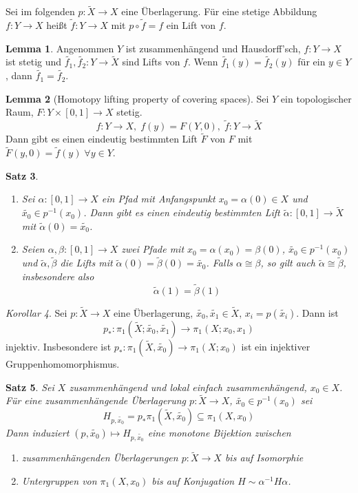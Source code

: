 \documentclass[a4paper, 12pt]{article}
\theoremstyle{plain}
\newtheorem{theorem}{Satz}[section] %
\theoremstyle{definition}
\theoremstyle{lemma}
\newtheorem{lemma}[theorem]{Lemma}
\theoremstyle{remark}
\theoremstyle{corollary}
\newtheorem{corollary}[theorem]{Korollar}
\theoremstyle{example}
\begin{document}
	Sei im folgenden $p: \tilde{X} \to X$ eine Überlagerung. Für eine stetige Abbildung $f:Y \to X$ heißt $\tilde{f}: Y \to X$ mit $p \circ \tilde{f} = f$ ein Lift von $f$.
	\begin{lemma}
		Angenommen $Y$ ist zusammenhängend und Hausdorff'sch, $f:Y \to X$ ist stetig und $\tilde{f_1}, \tilde{f_2}: Y \to \tilde{X}$ sind Lifts von $f$. Wenn $\tilde{f_1}(y) = \tilde{f_2}(y)$ für ein $y \in Y$, dann $\tilde{f_1} = \tilde{f_2}$. 
	\end{lemma}
	\begin{lemma}[Homotopy lifting property of covering spaces]
		Sei $Y$ ein topologischer Raum, $F:Y\times [0,1] \to X$ stetig. \[f:Y \to X, \; f(y) = F(Y,0), \; \tilde{f}: Y \to \tilde{X}\]
		Dann gibt es einen eindeutig bestimmten Lift $\tilde{F}$ von $F$ mit $\tilde{F}(y,0) = \tilde{f}(y) \; \forall y \in Y$.
	\end{lemma}
	\begin{theorem}
		\begin{enumerate}
			\item Sei $\alpha: [0,1] \to X$ ein Pfad mit Anfangspunkt $x_0 = \alpha(0) \in X$ und $\tilde{x_0} \in p^{-1}(x_0)$. Dann gibt es einen eindeutig bestimmten Lift $\tilde{\alpha}: [0,1] \to \tilde{X}$ mit $\tilde{\alpha}(0) = \tilde{x_0}$.
			\item Seien $\alpha, \beta: [0,1] \to X$ zwei Pfade mit $x_0 = \alpha(x_0) = \beta(0)$, $\tilde{x_0} \in p^{-1}(x_0)$ und $\tilde{\alpha}, \tilde{\beta}$ die Lifts mit $\tilde{\alpha}(0) = \tilde{\beta}(0) = \tilde{x_0}$. Falls $\alpha \cong \beta$, so gilt auch $\tilde{\alpha} \cong \tilde{\beta}$, insbesondere also \[\tilde{\alpha}(1) = \tilde{\beta}(1)\]
		\end{enumerate}
	\end{theorem}
	\begin{corollary}
		Sei $p: \tilde{X} \to X$ eine Überlagerung, $\tilde{x_0}, \tilde{x_1} \in \tilde{X}$, $x_i = p(\tilde{x_i})$. Dann ist \[p_*: \pi_1(\tilde{X}; \tilde{x_0}, \tilde{x_1}) \to \pi_1(X;x_0,x_1)\] injektiv. Insbesondere ist $p_*:\pi_1(\tilde{X}, \tilde{x_0}) \to \pi_1(X;x_0)$ ist ein injektiver Gruppenhomomorphismus.
	\end{corollary}
	\begin{theorem}
		Sei $X$ zusammenhängend und lokal einfach zusammenhängend, $x_0 \in X$. Für eine zusammenhängende Überlagerung $p: \tilde{X} \to X$, $\tilde{x_0} \in p^{-1}(x_0)$ sei \[H_{p,\tilde{x_0}} = p_*\pi_1(\tilde{X}, \tilde{x_0}) \subseteq \pi_1(X,x_0)\]
		Dann induziert $(p,\tilde{x_0}) \mapsto H_{p,\tilde{x_0}}$ eine monotone Bijektion zwischen \begin{enumerate}
			\item zusammenhängenden Überlagerungen $p: \tilde{X} \to X$ bis auf Isomorphie
			\item Untergruppen von $\pi_1(X,x_0)$ bis auf Konjugation $H \sim \alpha^{-1} H \alpha$.
		\end{enumerate}
	\end{theorem}
\end{document}
